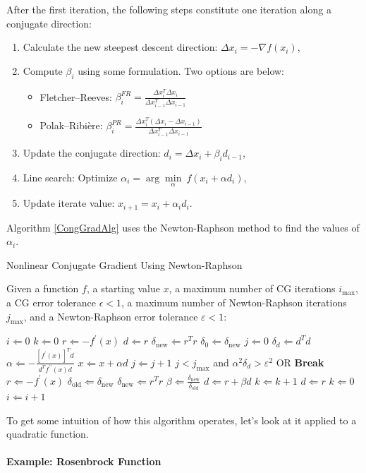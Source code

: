After the first iteration, the following steps constitute one iteration along a conjugate direction:
\begin{enumerate}
	\item Calculate the new steepest descent direction: $\Delta x_i=-\nabla f(x_i)$,
	\item Compute $\beta_i$ using some formulation. Two options are below:
	\begin{itemize}
		\item Fletcher--Reeves: $\beta_i^{FR}=\frac{\Delta x_i^T\Delta x_i}{\Delta x_{i-1}^T\Delta x_{i-1}}$
		\item Polak--Ribi\`{e}re: $\beta_{i}^{PR}=\frac{\Delta x_i^T(\Delta x_i-\Delta x_{i-1})}{\Delta x_{i-1}^T\Delta x_{i-1}}$
	\end{itemize}
	\item Update the conjugate direction: $d_i=\Delta x_i+\beta_i d_{i-1}$,
	\item Line search: Optimize $\alpha_i =\arg\underset{\alpha}{\min}\ f(x_i+\alpha d_i)$,
	\item Update iterate value: $x_{i+1}=x_i+\alpha_i d_i$.
\end{enumerate}

Algorithm \ref{CongGradAlg} uses the Newton-Raphson method to find the values of $\alpha_i$.

\begin{algorithm}
	\caption{Nonlinear Conjugate Gradient Using Newton-Raphson \cite{Shewchuk1994}\label{CongGradAlg}}
	Given a function $f$, a starting value $x$, a maximum number of CG iterations $i_{\text{max}}$, a CG error tolerance $\epsilon<1$, a maximum number of Newton-Raphson iterations $j_{\text{max}}$, and a Newton-Raphson error tolerance $\varepsilon<1$:
	\begin{algorithmic}
		\State $i\Leftarrow 0$
		\State $k\Leftarrow 0$
		\State $r\Leftarrow -f^{\prime}(x)$
		\State $d\Leftarrow r$
		\State $\delta_{\text{new}}\Leftarrow r^Tr$
		\State $\delta_0\Leftarrow\delta_{\text{new}}$
		\State $j\Leftarrow 0$
		\State $\delta_d\Leftarrow d^Td$
		\State $\alpha\Leftarrow -\frac{\left[f^{\prime}(x)\right]^Td}{d^Tf^{\prime\prime}(x)d}$
		\State $x\Leftarrow x+\alpha d$
		\State $j\Leftarrow j+1$
		\State $j<j_{\text{max}}$ and $\alpha^2\delta_d>\varepsilon^2$ OR \textbf{Break}
		\EndWhile
		\State $r\Leftarrow -f^{\prime}(x)$
		\State $\delta_{\text{old}}\Leftarrow\delta_{\text{new}}$
		\State $\delta_{\text{new}}\Leftarrow r^T r$
		\State $\beta\Leftarrow\frac{\delta_{\text{new}}}{\delta_{\text{old}}}$
		\State $d\Leftarrow r+\beta d$
		\State $k\Leftarrow k+1$
		\State $d\Leftarrow r$
		\State $k\Leftarrow 0$
		\EndIf
		\State $i\Leftarrow i+1$
		\EndWhile
	\end{algorithmic}
\end{algorithm}

To get some intuition of how this algorithm operates, let's look at it applied to a quadratic function.

\paragraph{Example: Rosenbrock Function}
